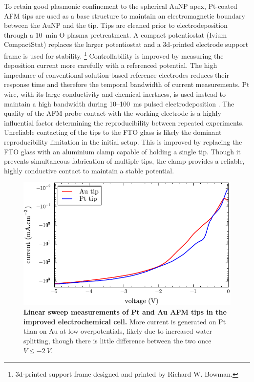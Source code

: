 \documentclass{article}
\begin{document}
To retain good plasmonic confinement to the spherical AuNP apex, Pt-coated AFM tips are used as a base structure to maintain an electromagnetic boundary between the AuNP and the tip. Tips are cleaned prior to electrodeposition through a \SI{10}{\minute} O plasma pretreatment. A compact potentiostat (Ivium CompactStat) replaces the larger potentiostat and a 3d-printed electrode support frame is used for stability.%
\footnote{3d-printed support frame designed and printed by Richard W. Bowman.}
Controllability is improved by measuring the deposition current more carefully with a referenced potential. The high impedance of conventional solution-based reference electrodes reduces their response time and therefore the temporal bandwidth of current measurements. Pt wire, with its large conductivity and chemical inertness, is used instead to maintain a high bandwidth during 10--\SI{100}{ms} pulsed electrodeposition \cite{sawyer1995electrochemistry}.
The quality of the AFM probe contact with the working electrode is a highly influential factor determining the reproducibility between repeated experiments. Unreliable contacting of the tips to the FTO glass is likely the dominant reproducibility limitation in the initial setup. This is improved by replacing the FTO glass with an aluminium clamp capable of holding a single tip. Though it prevents simultaneous fabrication of multiple tips, the clamp provides a reliable, highly conductive contact to maintain a stable potential.

\begin{figure}[bt]
\centering
\includegraphics{figures/linear_sweep_measurements}
\caption[Linear sweep measurements of Pt and Au AFM tips in the improved electrochemical cell]{\textbf{Linear sweep measurements of Pt and Au AFM tips in the improved electrochemical cell.} More current is generated on Pt than on Au at low overpotentials, likely due to increased water splitting, though there is little difference between the two once $V\leq\SI{-2}{V}$.}
\label{fig:linear_sweeps}
\end{figure}
\end{document}

